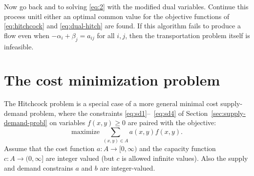 \documentclass{amsbook}
\theoremstyle{definition}
\theoremstyle{remark}
\begin{document}
Now go back and to solving \eqref{eq:2} with the modified dual variables.
Continue this process unitl either an optimal common value for the objective functions of \eqref{eq:hitchcock} and \eqref{eq:dual-hitch} are found.
If this algorithm fails to produce a flow even when $-\alpha_i+\beta_j=a_{ij}$ for all $i,j$, then the transportation problem itself is infeasible. 
\section{The cost minimization problem}
\label{sec:cost-minim-probl}
The Hitchcock problem is a special case of a more general minimal cost supply-demand problem, where the constraints \eqref{eq:sd1}--~\eqref{eq:sd4} of Section~\ref{sec:supply-demand-probl} on variables $f(x,y)\geq 0$ are paired with the objective:
\begin{displaymath}
  \text{maximize } \sum_{(x,y)\in A} a(x,y) f(x,y).
\end{displaymath}
Assume that the cost function $a:A\to [0,\infty)$ and the capacity function $c:A\to (0,\infty]$ are integer valued (but $c$ is allowed infinite values).
Also the supply and demand constrains $a$ and $b$ are integer-valued.
\end{document}
